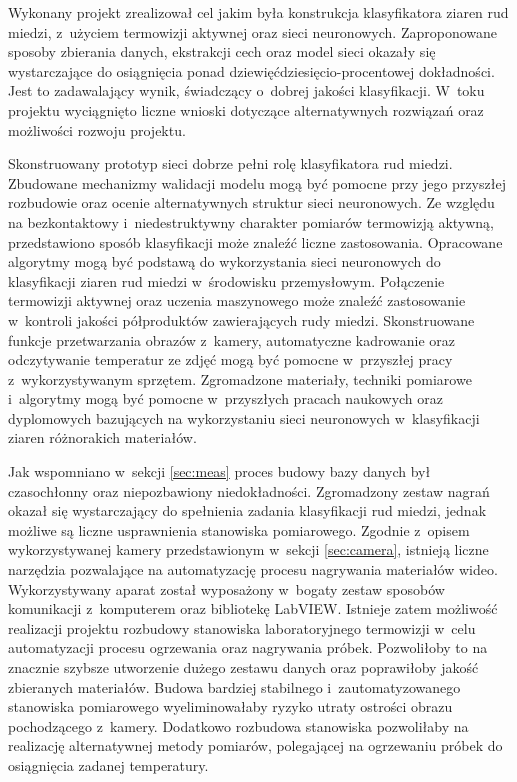 Wykonany projekt zrealizował cel jakim była konstrukcja klasyfikatora ziaren
rud miedzi, z~użyciem termowizji aktywnej oraz sieci neuronowych.
Zaproponowane sposoby zbierania danych, ekstrakcji cech oraz model sieci
okazały się wystarczające do osiągnięcia ponad dziewięćdziesięcio-procentowej
dokładności.
Jest to zadawalający wynik, świadczący o~dobrej jakości klasyfikacji.
W~toku projektu wyciągnięto liczne wnioski dotyczące alternatywnych
rozwiązań oraz możliwości rozwoju projektu.

Skonstruowany prototyp sieci dobrze pełni rolę klasyfikatora rud miedzi.
Zbudowane mechanizmy walidacji modelu mogą być pomocne przy jego
przyszłej rozbudowie oraz ocenie alternatywnych struktur sieci neuronowych.
Ze względu na bezkontaktowy i~niedestruktywny charakter pomiarów
termowizją aktywną, przedstawiono sposób klasyfikacji może znaleźć liczne
zastosowania.
Opracowane algorytmy mogą być podstawą do wykorzystania sieci neuronowych
do klasyfikacji ziaren rud miedzi w~środowisku przemysłowym.
Połączenie termowizji aktywnej oraz uczenia maszynowego może znaleźć
zastosowanie w~kontroli jakości półproduktów zawierających rudy miedzi.
Skonstruowane funkcje przetwarzania obrazów z~kamery, automatyczne kadrowanie
oraz odczytywanie temperatur ze zdjęć mogą być pomocne w~przyszłej pracy
z~wykorzystywanym sprzętem.
Zgromadzone materiały, techniki pomiarowe i~algorytmy mogą być pomocne
w~przyszłych pracach naukowych oraz dyplomowych bazujących na wykorzystaniu
sieci neuronowych w~klasyfikacji ziaren różnorakich materiałów.

Jak wspomniano w~sekcji \ref{sec:meas} proces budowy bazy danych był
czasochłonny oraz niepozbawiony niedokładności.
Zgromadzony zestaw nagrań okazał się wystarczający do spełnienia zadania
klasyfikacji rud miedzi, jednak możliwe są liczne usprawnienia stanowiska
pomiarowego.
Zgodnie z~opisem wykorzystywanej kamery przedstawionym w~sekcji
\ref{sec:camera}, istnieją liczne narzędzia pozwalające na automatyzację
procesu nagrywania materiałów wideo.
Wykorzystywany aparat został wyposażony w~bogaty zestaw sposobów komunikacji
z~komputerem oraz bibliotekę LabVIEW.
Istnieje zatem możliwość realizacji projektu rozbudowy stanowiska
laboratoryjnego termowizji w~celu automatyzacji procesu ogrzewania oraz
nagrywania próbek.
Pozwoliłoby to na znacznie szybsze utworzenie dużego zestawu danych oraz
poprawiłoby jakość zbieranych materiałów.
Budowa bardziej stabilnego i~zautomatyzowanego stanowiska pomiarowego
wyeliminowałaby ryzyko utraty ostrości obrazu pochodzącego z~kamery.
Dodatkowo rozbudowa stanowiska pozwoliłaby na realizację alternatywnej
metody pomiarów, polegającej na ogrzewaniu próbek do osiągnięcia zadanej
temperatury.

